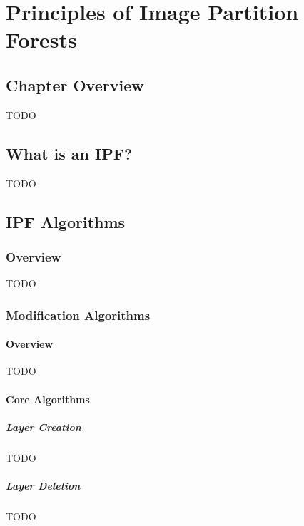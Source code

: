\chapter{Principles of Image Partition Forests}
\label{chap:ipfs}

\section{Chapter Overview}

TODO

\section{What is an IPF?}

TODO

\section{IPF Algorithms}

\subsection{Overview}

TODO

\subsection{Modification Algorithms}

\subsubsection{Overview}

TODO

\subsubsection{Core Algorithms}

\paragraph{Layer Creation}

TODO

\paragraph{Layer Deletion}

TODO

